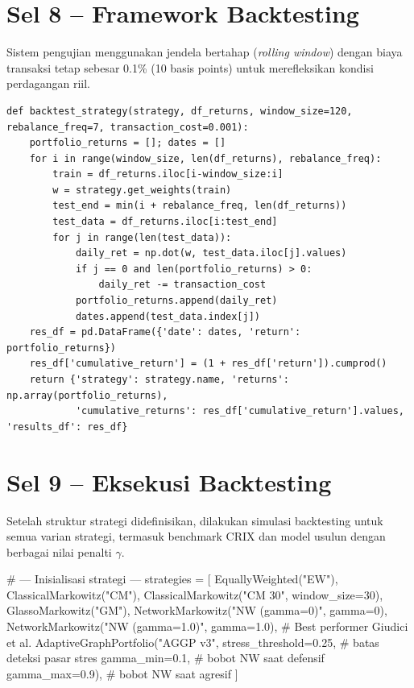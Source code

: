 \documentclass[12pt,a4paper]{article}
\begin{document}
\section{Sel 8 -- Framework Backtesting}
Sistem pengujian menggunakan jendela bertahap (\textit{rolling window}) dengan biaya transaksi tetap sebesar 0.1\% (10 basis points) untuk merefleksikan kondisi perdagangan riil.

\begin{lstlisting}[caption={Fungsi simulasi backtest}]
def backtest_strategy(strategy, df_returns, window_size=120, rebalance_freq=7, transaction_cost=0.001):
    portfolio_returns = []; dates = []
    for i in range(window_size, len(df_returns), rebalance_freq):
        train = df_returns.iloc[i-window_size:i]
        w = strategy.get_weights(train)
        test_end = min(i + rebalance_freq, len(df_returns))
        test_data = df_returns.iloc[i:test_end]
        for j in range(len(test_data)):
            daily_ret = np.dot(w, test_data.iloc[j].values)
            if j == 0 and len(portfolio_returns) > 0:
                daily_ret -= transaction_cost
            portfolio_returns.append(daily_ret)
            dates.append(test_data.index[j])
    res_df = pd.DataFrame({'date': dates, 'return': portfolio_returns})
    res_df['cumulative_return'] = (1 + res_df['return']).cumprod()
    return {'strategy': strategy.name, 'returns': np.array(portfolio_returns),
            'cumulative_returns': res_df['cumulative_return'].values, 'results_df': res_df}
\end{lstlisting}

\section{Sel 9 -- Eksekusi Backtesting}
Setelah struktur strategi didefinisikan, dilakukan simulasi backtesting untuk semua varian strategi, termasuk benchmark CRIX dan model usulun dengan berbagai nilai penalti $\gamma$.

# --- Inisialisasi strategi ---
strategies = [
    EquallyWeighted("EW"),
    ClassicalMarkowitz("CM"),
    ClassicalMarkowitz("CM 30", window_size=30),
    GlassoMarkowitz("GM"),
    NetworkMarkowitz("NW (gamma=0)", gamma=0),
    NetworkMarkowitz("NW (gamma=1.0)", gamma=1.0),  # Best performer Giudici et al.
    AdaptiveGraphPortfolio("AGGP v3",
                           stress_threshold=0.25,   # batas deteksi pasar stres
                           gamma_min=0.1,            # bobot NW saat defensif
                           gamma_max=0.9),           # bobot NW saat agresif
]
\end{document}
